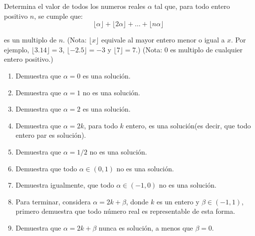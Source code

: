 \documentclass{article}
\begin{document}
Determina el valor de todos los numeros reales $\alpha$ tal que, para todo entero positivo $n$, se cumple que:
\[
    \lfloor \alpha \rfloor + \lfloor 2\alpha \rfloor + \ldots + \lfloor n\alpha \rfloor
\]

es un multiplo de $n$.
(Nota: $\lfloor x \rfloor$ equivale al mayor entero menor o igual a $x$. Por ejemplo, $\lfloor 3.14 \rfloor = 3$,
$\lfloor -2.5 \rfloor = -3$ y $\lfloor 7 \rfloor = 7$.)
(Nota: 0 es multiplo de cualquier entero positivo.)
\begin{enumerate}
    \item Demuestra que $\alpha = 0$ es una soluci\'on.
    \item Demuestra que $\alpha = 1$ no es una soluci\'on.
    \item Demuestra que $\alpha = 2$ es una soluci\'on.
    \item Demuestra que $\alpha = 2k$, para todo $k$ entero, es una soluci\'on(es decir, que todo entero par es soluci\'on).
    \item Demuestra que $\alpha = 1/2$ no es una soluci\'on.
    \item Demuestra que todo $\alpha \in (0, 1)$ no es una soluci\'on.
    \item Demuestra igualmente, que todo $\alpha \in (-1, 0)$ no es una soluci\'on.
    \item Para terminar, considera $\alpha = 2k + \beta$, donde $k$ es un entero y $\beta \in (-1, 1)$, primero demuestra que todo n\'umero real es representable de esta forma.
    \item Demuestra que $\alpha = 2k + \beta$ nunca es soluci\'on, a menos que $\beta = 0$.
\end{enumerate}
\end{document}
